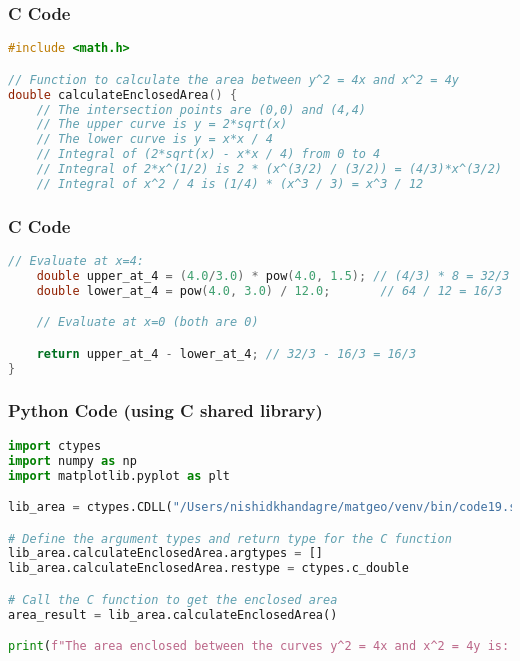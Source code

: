 \documentclass{beamer}
\begin{document}
\begin{frame}[fragile]
\frametitle{C Code}
\begin{lstlisting}[language=C]
#include <math.h>

// Function to calculate the area between y^2 = 4x and x^2 = 4y
double calculateEnclosedArea() {
    // The intersection points are (0,0) and (4,4)
    // The upper curve is y = 2*sqrt(x)
    // The lower curve is y = x*x / 4
    // Integral of (2*sqrt(x) - x*x / 4) from 0 to 4
    // Integral of 2*x^(1/2) is 2 * (x^(3/2) / (3/2)) = (4/3)*x^(3/2)
    // Integral of x^2 / 4 is (1/4) * (x^3 / 3) = x^3 / 12
\end{lstlisting}
\end{frame}

\begin{frame}[fragile]
\frametitle{C Code}
\begin{lstlisting}[language=C]
    // Evaluate at x=4:
    double upper_at_4 = (4.0/3.0) * pow(4.0, 1.5); // (4/3) * 8 = 32/3
    double lower_at_4 = pow(4.0, 3.0) / 12.0;       // 64 / 12 = 16/3

    // Evaluate at x=0 (both are 0)

    return upper_at_4 - lower_at_4; // 32/3 - 16/3 = 16/3
}
\end{lstlisting}
\end{frame}

\begin{frame}[fragile]
\frametitle{Python Code (using C shared library)}
\begin{lstlisting}[language=Python]
import ctypes
import numpy as np
import matplotlib.pyplot as plt

lib_area = ctypes.CDLL("/Users/nishidkhandagre/matgeo/venv/bin/code19.so")

# Define the argument types and return type for the C function
lib_area.calculateEnclosedArea.argtypes = []
lib_area.calculateEnclosedArea.restype = ctypes.c_double

# Call the C function to get the enclosed area
area_result = lib_area.calculateEnclosedArea()

print(f"The area enclosed between the curves y^2 = 4x and x^2 = 4y is: {area_result:.4f}")
\end{lstlisting}
\end{frame}
\end{document}
